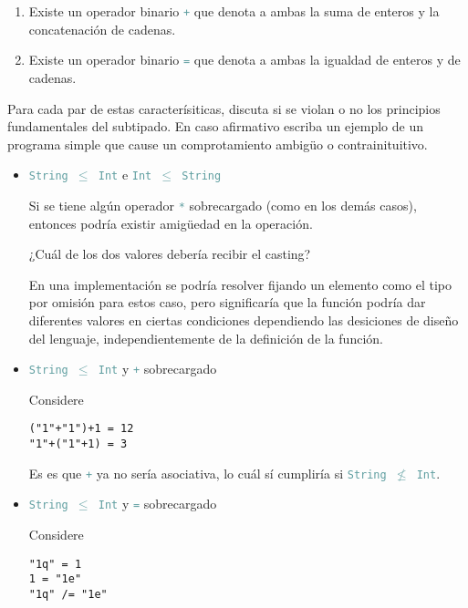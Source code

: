 \documentclass{article}
\newcommand{\tp}[1]{\textcolor{CadetBlue} {\texttt{#1}}}
\begin{document}
\begin{enumerate}
\begin{enumerate}
            \item Existe un operador binario \tp{+} que denota a ambas la suma
            de enteros y la concatenación de cadenas.

            \item Existe un operador binario \tp{=} que denota a ambas la
            igualdad de enteros y de cadenas.
        \end{enumerate}

        Para cada par de estas caracterísiticas, discuta si se violan o no los
        principios fundamentales del subtipado. En caso afirmativo escriba un
        ejemplo de un programa simple que cause un comprotamiento ambigüo o
        contrainituitivo.

        \begin{itemize}
            \item \tp{String $\leq$ Int} e \tp{Int $\leq$ String}

            Si se tiene algún operador \tp{*} sobrecargado (como en los demás
            casos), entonces podría existir amigüedad en la operación.

            ¿Cuál de los dos valores debería recibir el casting?

            En una implementación se podría resolver fijando un elemento como el
            tipo por omisión para estos caso, pero significaría que la función
            podría dar diferentes valores en ciertas condiciones dependiendo las
            desiciones de diseño del lenguaje, independientemente de la
            definición de la función.

            \item \tp{String $\leq$ Int} y \tp{+} sobrecargado

            Considere

            \begin{verbatim}
("1"+"1")+1 = 12
"1"+("1"+1) = 3
            \end{verbatim}

            Es es que \tp{+} ya no sería asociativa, lo cuál sí cumpliría si
            \tp{String $\not \leq$ Int}.

            \item \tp{String $\leq$ Int} y \tp{=} sobrecargado

            Considere

            \begin{verbatim}
"1q" = 1
1 = "1e"
"1q" /= "1e"
            \end{verbatim}


\end{itemize}
\end{enumerate}
\end{document}
